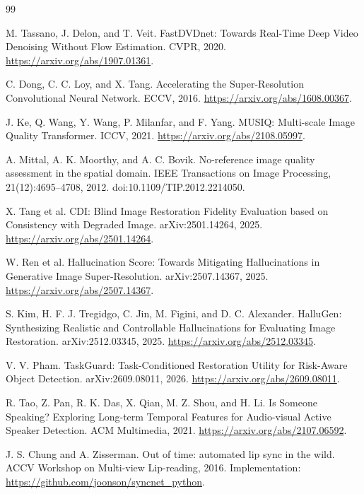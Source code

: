 {\small
\begin{thebibliography}{99}

 M. Tassano, J. Delon, and T. Veit. FastDVDnet: Towards Real-Time Deep Video Denoising Without Flow Estimation. CVPR, 2020. \url{https://arxiv.org/abs/1907.01361}.

 C. Dong, C. C. Loy, and X. Tang. Accelerating the Super-Resolution Convolutional Neural Network. ECCV, 2016. \url{https://arxiv.org/abs/1608.00367}.

 J. Ke, Q. Wang, Y. Wang, P. Milanfar, and F. Yang. MUSIQ: Multi-scale Image Quality Transformer. ICCV, 2021. \url{https://arxiv.org/abs/2108.05997}.

 A. Mittal, A. K. Moorthy, and A. C. Bovik. No-reference image quality assessment in the spatial domain. IEEE Transactions on Image Processing, 21(12):4695--4708, 2012. doi:10.1109/TIP.2012.2214050.

 X. Tang et al. CDI: Blind Image Restoration Fidelity Evaluation based on Consistency with Degraded Image. arXiv:2501.14264, 2025. \url{https://arxiv.org/abs/2501.14264}.

 W. Ren et al. Hallucination Score: Towards Mitigating Hallucinations in Generative Image Super-Resolution. arXiv:2507.14367, 2025. \url{https://arxiv.org/abs/2507.14367}.

 S. Kim, H. F. J. Tregidgo, C. Jin, M. Figini, and D. C. Alexander. HalluGen: Synthesizing Realistic and Controllable Hallucinations for Evaluating Image Restoration. arXiv:2512.03345, 2025. \url{https://arxiv.org/abs/2512.03345}.

 V. V. Pham. TaskGuard: Task-Conditioned Restoration Utility for Risk-Aware Object Detection. arXiv:2609.08011, 2026. \url{https://arxiv.org/abs/2609.08011}.

 R. Tao, Z. Pan, R. K. Das, X. Qian, M. Z. Shou, and H. Li. Is Someone Speaking? Exploring Long-term Temporal Features for Audio-visual Active Speaker Detection. ACM Multimedia, 2021. \url{https://arxiv.org/abs/2107.06592}.

 J. S. Chung and A. Zisserman. Out of time: automated lip sync in the wild. ACCV Workshop on Multi-view Lip-reading, 2016. Implementation: \url{https://github.com/joonson/syncnet_python}.


\end{thebibliography}}
